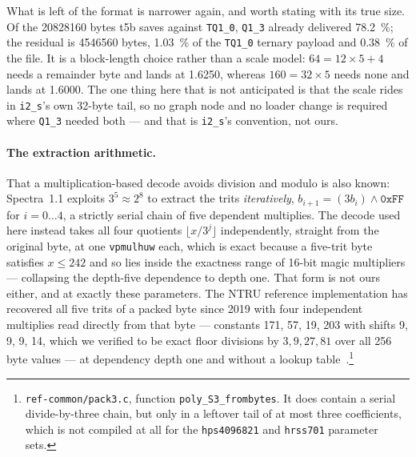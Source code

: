 \documentclass[11pt,a4paper]{article}
\newcommand{\code}[1]{\texttt{#1}}
\begin{document}
What is left of the format is narrower again, and worth stating with its true
size. Of the \num{20828160} bytes t5b saves against \code{TQ1\_0},
\code{Q1\_3} already delivered \SI{78.2}{\percent}; the residual is
\num{4546560} bytes, \SI{1.03}{\percent} of the \code{TQ1\_0} ternary
payload and \SI{0.38}{\percent} of the file. It is a block-length choice
rather than a scale model: $64 = 12\times5+4$ needs a remainder byte and
lands at \num{1.6250}, whereas $160 = 32\times5$ needs none and lands at
\num{1.6000}. The one thing here that is not anticipated is that the
scale rides in \code{i2\_s}'s own 32-byte tail, so no graph node and no
loader change is required where \code{Q1\_3} needed both --- and that is
\code{i2\_s}'s convention, not ours.

\paragraph{The extraction arithmetic.} That a
multiplication-based decode avoids division and modulo is also known:
Spectra~1.1 exploits $3^{5}\approx 2^{8}$ to extract the trits
\emph{iteratively}, $b_{i+1}=(3b_{i})\wedge\texttt{0xFF}$ for
$i=0\dots4$, a strictly serial chain of five dependent multiplies. The
decode used here instead takes all four quotients
$\lfloor x/3^{j}\rfloor$ independently, straight from the original
byte, at one \code{vpmulhuw} each, which is exact because a five-trit
byte satisfies $x\le\num{242}$ and so lies inside the exactness range of
16-bit magic multipliers --- collapsing the depth-five dependence to depth
one. That form is not ours either, and at exactly these
parameters. The NTRU reference implementation has recovered all five
trits of a packed byte since 2019 with four independent multiplies read
directly from that byte --- constants \num{171}, \num{57}, \num{19},
\num{203} with shifts \num{9}, \num{9}, \num{9}, \num{14}, which we
verified to be exact floor divisions by $3,9,27,81$ over all 256 byte
values --- at dependency depth one and without a lookup
table~\cite{ntru}.\footnote{\code{ref-common/pack3.c}, function
\code{poly\_S3\_frombytes}. It does contain a serial divide-by-three
chain, but only in a leftover tail of at most three coefficients, which is
not compiled at all for the \code{hps4096821} and \code{hrss701} parameter
sets.}
\end{document}
